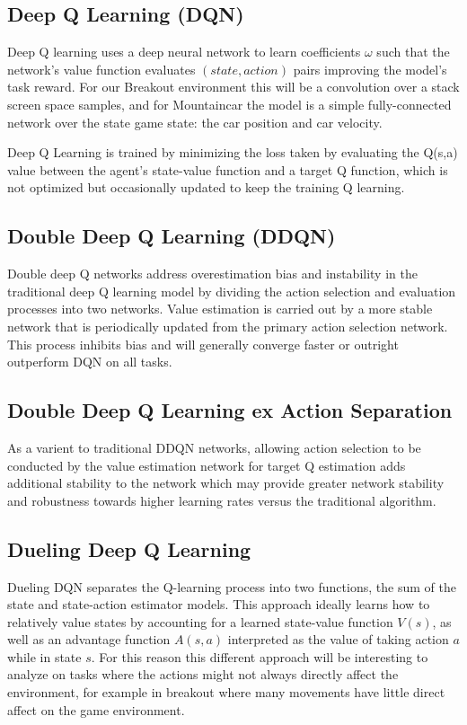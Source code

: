 \documentclass[conference]{IEEEtran}
\begin{document}
\subsection{Deep Q Learning (DQN)}
Deep Q learning uses a deep neural network to learn coefficients $\omega$ such that the network's value function evaluates $(state, action)$ pairs improving the model's task reward. For our Breakout environment this will be a convolution over a stack screen space samples, and for Mountaincar the model is a simple fully-connected network over the state game state: the car position and car velocity.

Deep Q Learning is trained by minimizing the loss taken by evaluating the Q(s,a) value between the agent's state-value function and a target Q function, which is not optimized but occasionally updated to keep the training Q learning.

\subsection{Double Deep Q Learning (DDQN)}
Double deep Q networks address overestimation bias and instability in the traditional deep Q learning model by dividing the action selection and evaluation processes into two networks.  Value estimation is carried out by a more stable network that is periodically updated from the primary action selection network. This process inhibits bias and will generally converge faster or outright outperform DQN on all tasks.

\subsection{Double Deep Q Learning ex Action Separation}
As a varient to traditional DDQN networks, allowing action selection to be conducted by the value estimation network for target Q estimation adds additional stability to the network which may provide greater network stability and robustness towards higher learning rates versus the traditional algorithm.

\subsection{Dueling Deep Q Learning}
Dueling DQN separates the Q-learning process into two functions, the sum of the state and state-action estimator models. This approach ideally learns how to relatively value states by accounting for a learned state-value function $V(s)$, as well as an advantage function $A(s,a)$ interpreted as the value of taking action $a$ while in state $s$. For this reason this different approach will be interesting to analyze on tasks where the actions might not always directly affect the environment, for example in breakout where many movements have little direct affect on the game environment.
\end{document}
